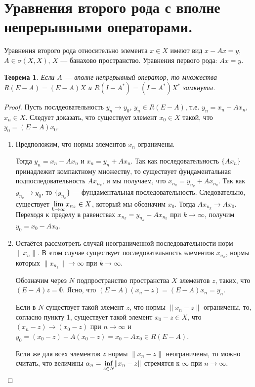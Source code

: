 \documentclass[12pt,a4paper,titlepage,oneside]{book}
\theoremstyle{definition}
\theoremstyle{plain}
\newtheorem*{theorem}{Теорема}
\theoremstyle{break}
\theoremstyle{remark}
\theoremstyle{remark}
\theoremstyle{remark}
\theoremstyle{remark}
\theoremstyle{plain}
\theoremstyle{plain}
\begin{document}
\section{Уравнения второго рода с вполне непрерывными операторами.}
Уравнения второго рода относительно элемента $x \in X$ имеют вид $x-Ax=y$, $A \in \sigma(X,X)$, $X$ --- банахово пространство. Уравнения первого рода: $Ax=y$.

\begin{theorem}
Если $A$ --- вполне непрерывный оператор, то множества $R(E-A)=(E-A)X$ и $R(I-A^*)=(I-A^*)X^*$ замкнуты.
\end{theorem}
\begin{proof}
Пусть послдеовательность $y_n \to y_0$, $y_n \in R(E-A)$, т.е. $y_n=x_n-Ax_n$, $x_n \in X$. Следует доказать, что существует элемент $x_0 \in X$ такой, что $y_0=(E-A)x_0$.
\begin{enumerate}

	\item Предположим, что нормы элементов $x_n$ ограничены.

Тогда $y_n=x_n-Ax_n$ и $x_n=y_n+Ax_n$. Так как последовательность $\lbrace Ax_n \rbrace$ принадлежит компактному множеству, то существует фундаментальная подпоследовательность $Ax_{n_k}$, и мы получаем, что $x_{n_k}=y_{n_k}+Ax_{n_k}$. Так как $y_{n_k} \to y_0$, то $\{y_{n_k}\}$ --- фундаментальная последовательность. Следовательно, существует $\smash{\displaystyle\lim_{k \to \infty}} x_{n_k} \in X$, который мы обозначим $x_0$. Тогда $Ax_{n_k} \to Ax_0$. Переходя к пределу в равенствах $x_{n_k}=y_{n_k}+Ax_{n_k}$ при $k \to \infty$, получим $y_0=x_0-Ax_0$.
	
	\item Остаётся рассмотреть случай неограниченной последовательности норм $\lVert x_n \rVert$. В этом случае существует последовательность элементов $x_{n_k}$, нормы которых $\lVert x_{n_k} \rVert \to \infty$ при $k \to \infty$.
	
	Обозначим через $N$ подпространство пространства $X$ элементов $z$, таких, что $(E-A)z=\mathbb{0}$. Ясно, что $(E-A)(x_n-z)=(E-A)x_n=y_n$.
	
	Если в $N$ существует такой элемент $z$, что нормы $\lVert x_n-z \rVert$ ограничены, то, согласно пункту 1, существует такой элемент $x_0-z \in X$, что $(x_n-z)\to (x_0-z)$ при $n \to \infty$ и $y_0=(x_0-z)-A(x_0-z)=x_0-Ax_0 \in R(E-A)$.
	
	Если же для всех элементов $z$ нормы $\lVert x_n-z \rVert$ неограничены, то можно считать, что величины $\alpha_n=\smash{\displaystyle\inf_{z \in N}} \lVert x_n-z \rVert$ стремятся к $\infty$ при $n \to \infty$.
	

\end{enumerate}
\end{proof}
\end{document}

